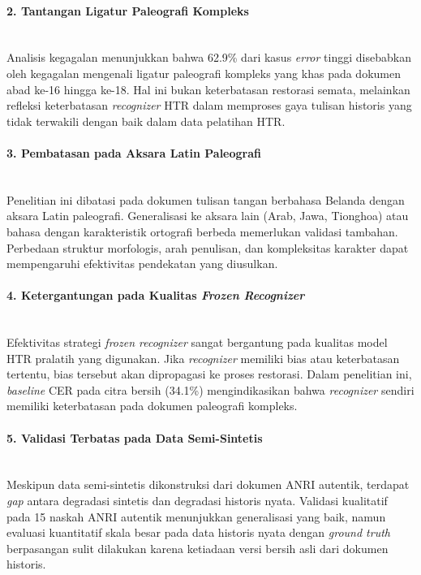 \documentclass[12pt,a4paper]{article}
\begin{document}
\paragraph{2. Tantangan Ligatur Paleografi Kompleks} \mbox{}\\[0.1em]
Analisis kegagalan menunjukkan bahwa 62.9\% dari kasus \textit{error} tinggi disebabkan oleh kegagalan mengenali ligatur paleografi kompleks yang khas pada dokumen abad ke-16 hingga ke-18. Hal ini bukan keterbatasan restorasi semata, melainkan refleksi keterbatasan \textit{recognizer} HTR dalam memproses gaya tulisan historis yang tidak terwakili dengan baik dalam data pelatihan HTR.

\paragraph{3. Pembatasan pada Aksara Latin Paleografi} \mbox{}\\[0.1em]
Penelitian ini dibatasi pada dokumen tulisan tangan berbahasa Belanda dengan aksara Latin paleografi. Generalisasi ke aksara lain (Arab, Jawa, Tionghoa) atau bahasa dengan karakteristik ortografi berbeda memerlukan validasi tambahan. Perbedaan struktur morfologis, arah penulisan, dan kompleksitas karakter dapat mempengaruhi efektivitas pendekatan yang diusulkan.

\paragraph{4. Ketergantungan pada Kualitas \textit{Frozen Recognizer}} \mbox{}\\[0.1em]
Efektivitas strategi \textit{frozen recognizer} sangat bergantung pada kualitas model HTR pralatih yang digunakan. Jika \textit{recognizer} memiliki bias atau keterbatasan tertentu, bias tersebut akan dipropagasi ke proses restorasi. Dalam penelitian ini, \textit{baseline} CER pada citra bersih (34.1\%) mengindikasikan bahwa \textit{recognizer} sendiri memiliki keterbatasan pada dokumen paleografi kompleks.

\paragraph{5. Validasi Terbatas pada Data Semi-Sintetis} \mbox{}\\[0.1em]
Meskipun data semi-sintetis dikonstruksi dari dokumen ANRI autentik, terdapat \textit{gap} antara degradasi sintetis dan degradasi historis nyata. Validasi kualitatif pada 15 naskah ANRI autentik menunjukkan generalisasi yang baik, namun evaluasi kuantitatif skala besar pada data historis nyata dengan \textit{ground truth} berpasangan sulit dilakukan karena ketiadaan versi bersih asli dari dokumen historis.
\end{document}

